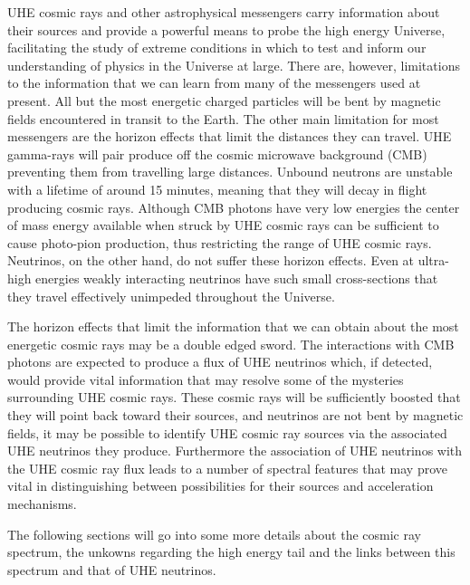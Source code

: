 UHE cosmic rays and other astrophysical messengers carry information about their sources and provide a powerful means to probe the high energy Universe, facilitating the study of extreme conditions in which to test and inform our understanding of physics in the Universe at large. There are, however, limitations to the information that we can learn from many of the messengers used at present. All but the most energetic charged particles will be bent by magnetic fields encountered in transit to the Earth. The other main limitation for most messengers are the horizon effects that limit the distances they can travel. UHE gamma-rays will pair produce \Pelectron\Ppositron off the cosmic microwave background (CMB) preventing them from travelling large distances. Unbound neutrons are unstable with a lifetime of around 15 minutes, meaning that they will decay in flight producing cosmic rays. Although CMB photons have very low energies the center of mass energy available when struck by UHE cosmic rays can be sufficient to cause photo-pion production, thus restricting the range of UHE cosmic rays. Neutrinos, on the other hand, do not suffer these horizon effects. Even at ultra-high energies weakly interacting neutrinos have such small cross-sections that they travel effectively unimpeded throughout the Universe. 

The horizon effects that limit the information that we can obtain about the most energetic cosmic rays may be a double edged sword. The interactions with CMB photons are expected to produce a flux of UHE neutrinos which, if detected, would provide vital information that may resolve some of the mysteries surrounding UHE cosmic rays. These cosmic rays will be sufficiently boosted that they will point back toward their sources, and neutrinos are not bent by magnetic fields, it may be possible to identify UHE cosmic ray sources via the associated UHE neutrinos they produce. Furthermore the association of UHE neutrinos with the UHE cosmic ray flux leads to a number of spectral features that may prove vital in distinguishing between possibilities for their sources and acceleration mechanisms.

The following sections will go into some more details about the cosmic ray spectrum, the unkowns regarding the high energy tail and the links between this spectrum and that of UHE neutrinos.



